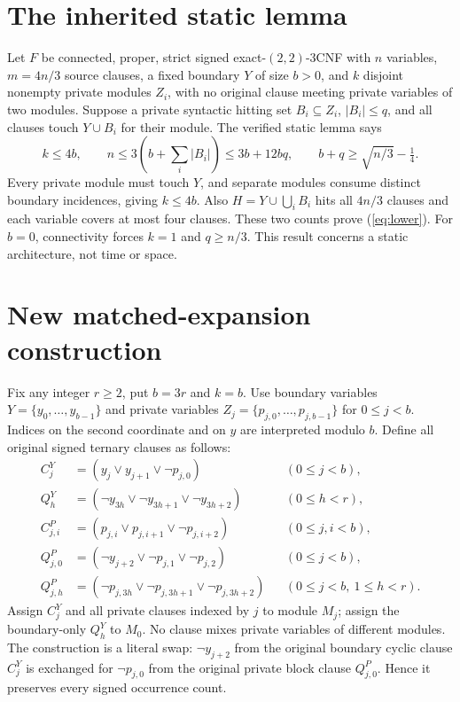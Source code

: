 \documentclass[11pt]{article}
\begin{document}
\section{The inherited static lemma}
Let $F$ be connected, proper, strict signed exact-$(2,2)$-3CNF with $n$ variables, $m=4n/3$ source clauses, a fixed boundary $Y$ of size $b>0$, and $k$ disjoint nonempty private modules $Z_i$, with no original clause meeting private variables of two modules. Suppose a private syntactic hitting set $B_i\subseteq Z_i$, $|B_i|\le q$, and all clauses touch $Y\cup B_i$ for their module. The verified static lemma says
\begin{equation}\label{eq:lower}
k\le4b,\qquad n\le3(b+\sum_i|B_i|)\le3b+12bq,
\qquad b+q\ge\sqrt{n/3}-\tfrac14.
\end{equation}
Every private module must touch $Y$, and separate modules consume distinct boundary incidences, giving $k\le4b$. Also $H=Y\cup\bigcup_i B_i$ hits all $4n/3$ clauses and each variable covers at most four clauses. These two counts prove (\ref{eq:lower}). For $b=0$, connectivity forces $k=1$ and $q\ge n/3$. This result concerns a static architecture, not time or space.

\section{New matched-expansion construction}
Fix any integer $r\ge2$, put $b=3r$ and $k=b$. Use boundary variables $Y=\{y_0,\ldots,y_{b-1}\}$ and private variables $Z_j=\{p_{j,0},\ldots,p_{j,b-1}\}$ for $0\le j<b$. Indices on the second coordinate and on $y$ are interpreted modulo $b$. Define all original signed ternary clauses as follows:
\begin{align}
 C_j^Y&=(y_j\vee y_{j+1}\vee\neg p_{j,0}) &&(0\le j<b),\label{eq:ybridge}\\
 Q_h^Y&=(\neg y_{3h}\vee\neg y_{3h+1}\vee\neg y_{3h+2})&&(0\le h<r),\label{eq:yblock}\\
 C_{j,i}^P&=(p_{j,i}\vee p_{j,i+1}\vee\neg p_{j,i+2})&&(0\le j,i<b),\label{eq:pcycle}\\
 Q_{j,0}^P&=(\neg y_{j+2}\vee\neg p_{j,1}\vee\neg p_{j,2})&&(0\le j<b),\label{eq:pbridge}\\
 Q_{j,h}^P&=(\neg p_{j,3h}\vee\neg p_{j,3h+1}\vee\neg p_{j,3h+2})&&(0\le j<b,\ 1\le h<r).\label{eq:pblock}
\end{align}
Assign $C_j^Y$ and all private clauses indexed by $j$ to module $M_j$; assign the boundary-only $Q_h^Y$ to $M_0$. No clause mixes private variables of different modules. The construction is a literal swap: $\neg y_{j+2}$ from the original boundary cyclic clause $C_{j}^Y$ is exchanged for $\neg p_{j,0}$ from the original private block clause $Q_{j,0}^P$. Hence it preserves every signed occurrence count.
\end{document}
